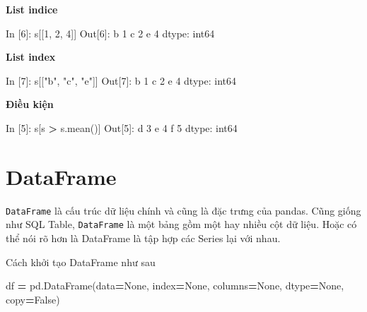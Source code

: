 \documentclass[
]{book}
\newenvironment{Shaded}{\begin{snugshade}}{\end{snugshade}}
\newcommand{\DecValTok}[1]{\textcolor[rgb]{0.00,0.00,0.81}{#1}}
\newcommand{\NormalTok}[1]{#1}
\newcommand{\OperatorTok}[1]{\textcolor[rgb]{0.81,0.36,0.00}{\textbf{#1}}}
\newcommand{\StringTok}[1]{\textcolor[rgb]{0.31,0.60,0.02}{#1}}
\newcommand{\VariableTok}[1]{\textcolor[rgb]{0.00,0.00,0.00}{#1}}
\begin{document}
\textbf{List indice}

\begin{Shaded}
\begin{Highlighting}[]
\NormalTok{In [}\DecValTok{6}\NormalTok{]: s[[}\DecValTok{1}\NormalTok{, }\DecValTok{2}\NormalTok{, }\DecValTok{4}\NormalTok{]]}
\NormalTok{Out[}\DecValTok{6}\NormalTok{]:}
\NormalTok{b    }\DecValTok{1}
\NormalTok{c    }\DecValTok{2}
\NormalTok{e    }\DecValTok{4}
\NormalTok{dtype: int64}
\end{Highlighting}
\end{Shaded}

\textbf{List index}

\begin{Shaded}
\begin{Highlighting}[]
\NormalTok{In [}\DecValTok{7}\NormalTok{]: s[[}\StringTok{"b"}\NormalTok{, }\StringTok{"c"}\NormalTok{, }\StringTok{"e"}\NormalTok{]]}
\NormalTok{Out[}\DecValTok{7}\NormalTok{]:}
\NormalTok{b    }\DecValTok{1}
\NormalTok{c    }\DecValTok{2}
\NormalTok{e    }\DecValTok{4}
\NormalTok{dtype: int64}
\end{Highlighting}
\end{Shaded}

\textbf{Điều kiện}

\begin{Shaded}
\begin{Highlighting}[]
\NormalTok{In [}\DecValTok{5}\NormalTok{]: s[s }\OperatorTok{\textgreater{}}\NormalTok{ s.mean()]}
\NormalTok{Out[}\DecValTok{5}\NormalTok{]:}
\NormalTok{d    }\DecValTok{3}
\NormalTok{e    }\DecValTok{4}
\NormalTok{f    }\DecValTok{5}
\NormalTok{dtype: int64}
\end{Highlighting}
\end{Shaded}

\section{DataFrame}\label{cach-khoi-tao-data-frame}

\texttt{DataFrame} là cấu trúc dữ liệu chính và cũng là đặc trưng của pandas. Cũng giống như SQL Table,
\texttt{DataFrame} là một bảng gồm một hay nhiều cột dữ liệu. Hoặc có thể nói rõ hơn là DataFrame là tập
hợp các Series lại với nhau.

Cách khởi tạo DataFrame như sau

\begin{Shaded}
\begin{Highlighting}[]
\NormalTok{df }\OperatorTok{=}\NormalTok{ pd.DataFrame(data}\OperatorTok{=}\VariableTok{None}\NormalTok{, index}\OperatorTok{=}\VariableTok{None}\NormalTok{, columns}\OperatorTok{=}\VariableTok{None}\NormalTok{, dtype}\OperatorTok{=}\VariableTok{None}\NormalTok{, copy}\OperatorTok{=}\VariableTok{False}\NormalTok{)}
\end{Highlighting}
\end{Shaded}
\end{document}
